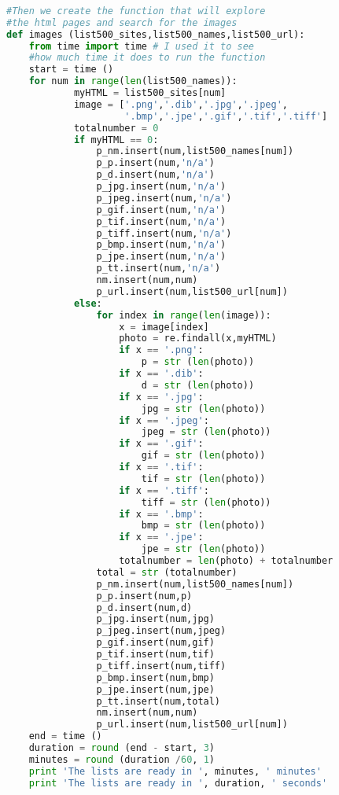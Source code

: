 \documentclass{article}
\begin{document}
\begin{lstlisting}[language=Python]
 
#Then we create the function that will explore 
#the html pages and search for the images
def images (list500_sites,list500_names,list500_url):
    from time import time # I used it to see 
    #how much time it does to run the function
    start = time ()
    for num in range(len(list500_names)):
            myHTML = list500_sites[num] 
            image = ['.png','.dib','.jpg','.jpeg',
                     '.bmp','.jpe','.gif','.tif','.tiff'] 
            totalnumber = 0 
            if myHTML == 0:
                p_nm.insert(num,list500_names[num])            
                p_p.insert(num,'n/a')  
                p_d.insert(num,'n/a')  
                p_jpg.insert(num,'n/a')  
                p_jpeg.insert(num,'n/a')  
                p_gif.insert(num,'n/a')  
                p_tif.insert(num,'n/a')  
                p_tiff.insert(num,'n/a')  
                p_bmp.insert(num,'n/a')  
                p_jpe.insert(num,'n/a')  
                p_tt.insert(num,'n/a')
                nm.insert(num,num)
                p_url.insert(num,list500_url[num])          
            else: 
                for index in range(len(image)):
                    x = image[index]
                    photo = re.findall(x,myHTML)
                    if x == '.png':
                        p = str (len(photo))
                    if x == '.dib':
                        d = str (len(photo))
                    if x == '.jpg':
                        jpg = str (len(photo))
                    if x == '.jpeg':
                        jpeg = str (len(photo))
                    if x == '.gif':
                        gif = str (len(photo))
                    if x == '.tif':
                        tif = str (len(photo))
                    if x == '.tiff':
                        tiff = str (len(photo))
                    if x == '.bmp':
                        bmp = str (len(photo))
                    if x == '.jpe':
                        jpe = str (len(photo))
                    totalnumber = len(photo) + totalnumber
                total = str (totalnumber)
                p_nm.insert(num,list500_names[num])            
                p_p.insert(num,p)  
                p_d.insert(num,d)  
                p_jpg.insert(num,jpg)  
                p_jpeg.insert(num,jpeg)  
                p_gif.insert(num,gif)  
                p_tif.insert(num,tif)  
                p_tiff.insert(num,tiff)  
                p_bmp.insert(num,bmp)  
                p_jpe.insert(num,jpe)  
                p_tt.insert(num,total)
                nm.insert(num,num)
                p_url.insert(num,list500_url[num])
    end = time ()
    duration = round (end - start, 3)
    minutes = round (duration /60, 1)
    print 'The lists are ready in ', minutes, ' minutes'
    print 'The lists are ready in ', duration, ' seconds'
 



\end{lstlisting}
\end{document}
